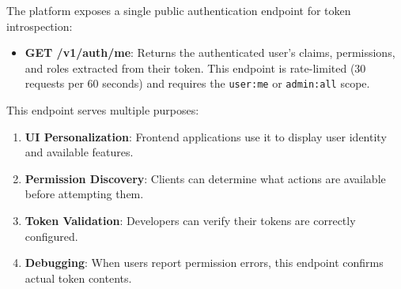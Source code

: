 The platform exposes a single public authentication endpoint for token introspection:

\begin{itemize}
    \item \textbf{GET /v1/auth/me}: Returns the authenticated user's claims, permissions, and roles extracted from their token. This endpoint is rate-limited (30 requests per 60 seconds) and requires the \texttt{user:me} or \texttt{admin:all} scope.
\end{itemize}

This endpoint serves multiple purposes:
\begin{enumerate}
    \item \textbf{UI Personalization}: Frontend applications use it to display user identity and available features.
    \item \textbf{Permission Discovery}: Clients can determine what actions are available before attempting them.
    \item \textbf{Token Validation}: Developers can verify their tokens are correctly configured.
    \item \textbf{Debugging}: When users report permission errors, this endpoint confirms actual token contents.
\end{enumerate}

